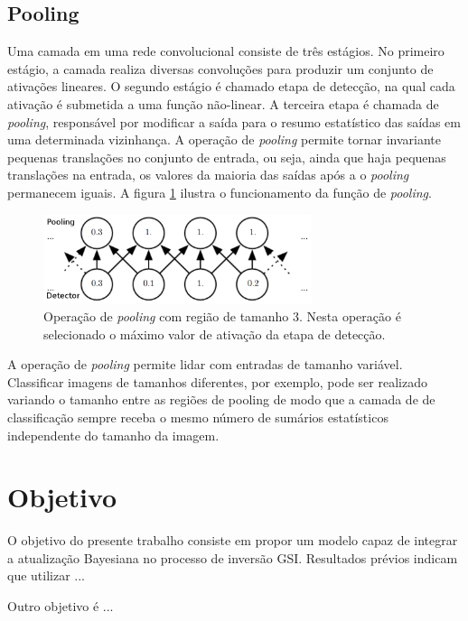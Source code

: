 \subsection{Pooling}
Uma camada em uma rede convolucional consiste de três estágios. No primeiro estágio,
a camada realiza diversas convoluções para produzir um conjunto de ativações lineares.
O segundo estágio é chamado etapa de detecção, na qual cada ativação é submetida a uma
função não-linear. A terceira etapa é chamada de \textit{pooling}, responsável por
modificar a saída para o resumo estatístico das saídas em uma determinada vizinhança. A operação de
\textit{pooling} permite tornar invariante pequenas translações no conjunto de entrada,
ou seja, ainda que haja pequenas translações na entrada, os valores da maioria das saídas após a
o \textit{pooling} permanecem iguais. A figura \ref{fig:pool} ilustra o funcionamento da função de \textit{pooling}.
\begin{figure}[htp]
\begin{center}
  \includegraphics[width=0.7\textwidth]{fig/pool}
  \caption{Operação de \textit{pooling} com região de tamanho 3. Nesta operação é selecionado o máximo valor de ativação da etapa de detecção.}
  \label{fig:pool}
\end{center}
\end{figure}

A operação de \textit{pooling} permite lidar com entradas de tamanho variável.
Classificar imagens de tamanhos diferentes, por exemplo, pode ser realizado
variando o tamanho entre as regiões de pooling de modo que a camada de 
de classificação sempre receba o mesmo número de sumários estatísticos
independente do tamanho da imagem.

\section{Objetivo}

O objetivo do presente trabalho consiste em propor um modelo capaz de integrar a
atualização Bayesiana no processo de inversão GSI. Resultados prévios indicam
que utilizar ...

Outro objetivo é ...

